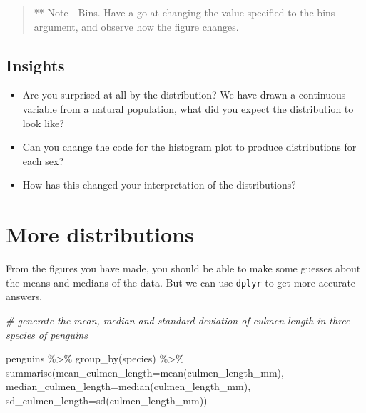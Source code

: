 \documentclass[
]{book}
\makeatletter
\newenvironment{Shaded}{\begin{snugshade}}{\end{snugshade}}
\newcommand{\AttributeTok}[1]{\textcolor[rgb]{0.77,0.63,0.00}{#1}}
\newcommand{\CommentTok}[1]{\textcolor[rgb]{0.56,0.35,0.01}{\textit{#1}}}
\newcommand{\FunctionTok}[1]{\textcolor[rgb]{0.00,0.00,0.00}{#1}}
\newcommand{\NormalTok}[1]{#1}
\newcommand{\SpecialCharTok}[1]{\textcolor[rgb]{0.00,0.00,0.00}{#1}}
\newenvironment{kframe}{%
\medskip{}
\setlength{\fboxsep}{.8em}
 \def\at@end@of@kframe{}%
 \ifinner\ifhmode%
  \def\at@end@of@kframe{\end{minipage}}%
  \begin{minipage}{\columnwidth}%
 \fi\fi%
 \def\FrameCommand##1{\hskip\@totalleftmargin \hskip-\fboxsep
 \colorbox{shadecolor}{##1}\hskip-\fboxsep
     \hskip-\linewidth \hskip-\@totalleftmargin \hskip\columnwidth}%
 \MakeFramed {\advance\hsize-\width
   \@totalleftmargin\z@ \linewidth\hsize
   \@setminipage}}%
 {\par\unskip\endMakeFramed%
 \at@end@of@kframe}
\newenvironment{block}[1]
  {
  \begin{itemize}
  \renewcommand{\labelitemi}{
    \raisebox{-.7\height}[0pt][0pt]{
      {\setkeys{Gin}{width=3em,keepaspectratio}\texttt{[image: images/\#1]}}
    }
  }
  \setlength{\fboxsep}{1em}
  \begin{kframe}
  \item
  }
  {
  \end{kframe}
  \end{itemize}
  }
\newenvironment{rmdquestion}
  {\begin{block}{question}}
  {\end{block}}
\makeatother
\begin{document}
\begin{quote}
** Note - Bins. Have a go at changing the value specified to the bins argument, and observe how the figure changes.
\end{quote}

\hypertarget{insights}{%
\subsection{Insights}\label{insights}}

\begin{rmdquestion}
\begin{itemize}
\item
  Are you surprised at all by the distribution? We have drawn a
  continuous variable from a natural population, what did you expect the
  distribution to look like?
\item
  Can you change the code for the histogram plot to produce
  distributions for each sex?
\item
  How has this changed your interpretation of the distributions?
\end{itemize}
\end{rmdquestion}

\hypertarget{more-distributions}{%
\section{More distributions}\label{more-distributions}}

From the figures you have made, you should be able to make some guesses about the means and medians of the data. But we can use \texttt{dplyr} to get more accurate answers.

\begin{Shaded}
\begin{Highlighting}[]
\CommentTok{\# generate the mean, median and standard deviation of culmen length in three species of penguins}

\NormalTok{penguins }\SpecialCharTok{\%\textgreater{}\%} 
  \FunctionTok{group\_by}\NormalTok{(species) }\SpecialCharTok{\%\textgreater{}\%} 
  \FunctionTok{summarise}\NormalTok{(}\AttributeTok{mean\_culmen\_length=}\FunctionTok{mean}\NormalTok{(culmen\_length\_mm),}
            \AttributeTok{median\_culmen\_length=}\FunctionTok{median}\NormalTok{(culmen\_length\_mm),}
            \AttributeTok{sd\_culmen\_length=}\FunctionTok{sd}\NormalTok{(culmen\_length\_mm))}
\end{Highlighting}
\end{Shaded}
\end{document}
